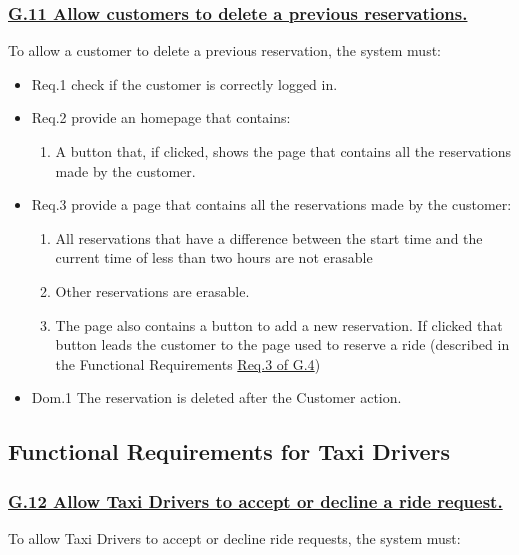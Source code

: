 \documentclass{report}
\begin{document}
			\subsubsection{\lbrack \hyperref[sec:g11]{G.11 Allow customers to delete a previous reservations.}\rbrack}
			To allow a customer to delete a previous reservation, the system must:

				\begin{itemize}
					\item \lbrack Req.1\rbrack \label{sec:fr1_g11} check if the customer is correctly logged in.
					\item \lbrack Req.2\rbrack \label{sec:fr2_g11} provide an homepage that contains:
						\begin{enumerate}
							\item A button that, if clicked, shows the page that contains all the reservations made by the customer.
						\end{enumerate}
					\item \lbrack Req.3\rbrack \label{sec:fr3_g11} provide a page that contains all the reservations made by the customer:
						\begin{enumerate}
							\item All reservations that have a difference between the start time and the current time of less than two hours are not erasable
							\item Other reservations are erasable.
							\item The page also contains a button to add a new reservation. If clicked that button leads the customer to the page used to reserve a ride (described in the Functional Requirements \hyperref[sec:fr3_g4]{Req.3 of G.4})
						\end{enumerate}
					\item \lbrack Dom.1\rbrack \label{sec:da1_g11} The reservation is deleted after the Customer action.
				\end{itemize}

		\subsection{Functional Requirements for Taxi Drivers}

			\subsubsection{\lbrack \hyperref[sec:g12]{G.12 Allow Taxi Drivers to accept or decline a ride request.}\rbrack}
			To allow Taxi Drivers to accept or decline ride requests, the system must:
\end{document}

